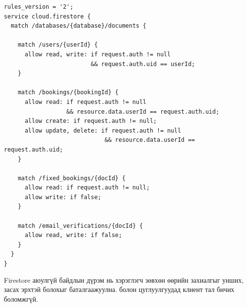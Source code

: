 \begin{lstlisting}[language={}, caption={firestore.rules}]
rules_version = '2';
service cloud.firestore {
  match /databases/{database}/documents {

    match /users/{userId} {
      allow read, write: if request.auth != null
                         && request.auth.uid == userId;
    }

    match /bookings/{bookingId} {
      allow read: if request.auth != null
                  && resource.data.userId == request.auth.uid;
      allow create: if request.auth != null;
      allow update, delete: if request.auth != null
                             && resource.data.userId == request.auth.uid;
    }

    match /fixed_bookings/{docId} {
      allow read: if request.auth != null;
      allow write: if false;
    }

    match /email_verifications/{docId} {
      allow read, write: if false;
    }
  }
}
\end{lstlisting}

Firestore аюулгүй байдлын дүрэм нь хэрэглэгч зөвхөн өөрийн захиалгыг унших, засах эрхтэй болохыг баталгаажуулна.  болон  цуглуулгуудад клиент тал бичих боломжгүй.
